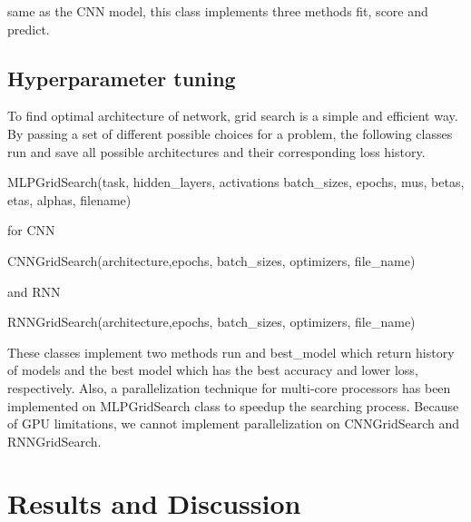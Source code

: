 \documentclass[10pt]{SelfArx} %
\begin{document}
	same as the CNN model, this class implements three methods fit, score and predict.
	
	\subsection{Hyperparameter tuning}
	To find optimal architecture of network, grid search is a simple and efficient way. By passing a set of different possible choices for a problem, the following classes run and save all possible architectures and their corresponding loss history.
	\begin{python}
MLPGridSearch(task, hidden_layers, 
activations batch_sizes,
epochs, mus, betas, etas,
alphas, filename)
	\end{python}
	for CNN
	\begin{python}
CNNGridSearch(architecture,epochs,
batch_sizes, optimizers,
file_name)
	\end{python}
	and RNN
	\begin{python}
RNNGridSearch(architecture,epochs,
batch_sizes, optimizers,
file_name)
	\end{python}
	
	These classes implement two methods run and best\_model which return history of models and the best model which has the best accuracy and lower loss, respectively. Also, a parallelization technique for multi-core processors has been implemented on MLPGridSearch class to speedup the searching process. Because of GPU limitations, we cannot implement parallelization on CNNGridSearch and RNNGridSearch.
	
	\section{Results and Discussion}
	
\end{document}
